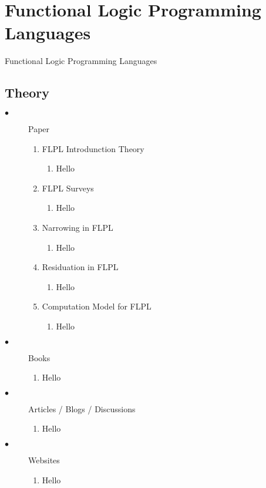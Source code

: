 \documentclass[thesis-solanki.tex]{subfiles}
\begin{document}
\chapter{Functional Logic Programming Languages}\label{chap:flpl}


Functional Logic Programming Languages

\section{Theory}
\begin{description}

\item[$\bullet$] Paper
\begin{enumerate}
\item FLPL Introdunction Theory
\begin{enumerate}
\item Hello
\end{enumerate}

\item FLPL Surveys
\begin{enumerate}
\item Hello
\end{enumerate}

\item Narrowing in FLPL 
\begin{enumerate}
\item Hello
\end{enumerate}

\item Residuation in FLPL
\begin{enumerate}
\item Hello
\end{enumerate}

\item Computation Model for FLPL
\begin{enumerate}
\item Hello
\end{enumerate}

\end{enumerate}

\item[$\bullet$] Books
\begin{enumerate}
\item Hello
\end{enumerate}

\item[$\bullet$] Articles / Blogs / Discussions
\begin{enumerate}
\item Hello
\end{enumerate}

\item[$\bullet$] Websites
\begin{enumerate}
\item Hello
\end{enumerate}

\end{description}
\end{document}
